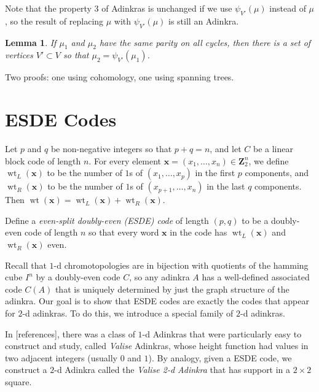 \documentclass[12pt,twoside,singlespace]{article}
\numberwithin{equation}{section}
\newtheorem{lem}[equation]{Lemma}
\theoremstyle{definition}
\newcommand{\ZZ}{\mathbf{Z}}
\newcommand{\on}{\operatorname}
\newcommand{\wt}{\on{wt}}
\renewcommand{\vec}[1]{\mathbf{#1}}
\begin{document}
Note that the property 3 of Adinkras is unchanged if we use $\psi_{V'}(\mu)$ instead of $\mu$, so the result of replacing $\mu$ with $\psi_{V'}(\mu)$ is still an Adinkra.

\begin{lem}
If $\mu_1$ and $\mu_2$ have the same parity on all cycles, then there is a set of vertices $V'\subset V$ so that $\mu_2=\psi_{V'}(\mu_1)$.
\end{lem}

Two proofs: one using cohomology, one using spanning trees.








\section{ESDE Codes}
Let $p$ and $q$ be non-negative integers so that $p+q=n$, and let $C$ be a linear block code of length $n$.  For every element $\vec{x}=(x_1,\ldots,x_n)\in\ZZ_2^n$, we define $\wt_L(\vec{x})$ to be the number of $1$s of $(x_1,\ldots,x_p)$ in the first $p$ components, and $\wt_R(\vec{x})$ to be the number of $1$s of $(x_{p+1},\ldots,x_n)$ in the last $q$ components.  Then $\wt(\vec{x})=\wt_L(\vec{x})+\wt_R(\vec{x})$.


Define a \emph{even-split doubly-even (ESDE) code} of length $(p,q)$ to be a doubly-even code of length $n$ so that every word $\vec{x}$ in the code has $\wt_L(\vec{x})$ and $\wt_R(\vec{x})$ even.

Recall that $1$-d chromotopologies are in bijection with quotients of the hamming cube $I^n$ by a doubly-even code $C$, so any adinkra $A$ has a well-defined associated code $C(A)$ that is uniquely determined by just the graph structure of the adinkra. Our goal is to show that ESDE codes are exactly the codes that appear for $2$-d adinkras. To do this, we introduce a special family of $2$-d adinkras.

In [references], there was a class of $1$-d Adinkras that were particularly easy to construct and study, called {\em Valise} Adinkras, whose height function had values in two adjacent integers (usually $0$ and $1$).  By analogy, given a ESDE code, we construct a $2$-d Adinkra called the {\em Valise 2-d Adinkra} that has support in a $2\times 2$ square.
\end{document}
